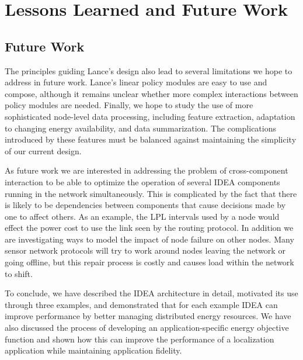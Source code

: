 \chapter{Lessons Learned and Future Work}
\label{chap-lessons}

\section{Future Work}


The principles guiding Lance's design also lead to several limitations we
hope to address in future work.  Lance's linear policy modules are easy to
use and compose, although it remains unclear whether more complex
interactions between policy modules are needed. Finally, we hope to study the
use of more sophisticated node-level data processing, including feature
extraction, adaptation to changing energy availability, and data
summarization.  The complications introduced by these features must be
balanced against maintaining the simplicity of our current design.


As future work we are interested in addressing the problem of cross-component
interaction to be able to optimize the operation of several IDEA components
running in the network simultaneously. This is complicated by the fact that
there is likely to be dependencies between components that cause decisions
made by one to affect others. As an example, the LPL intervals used by a node
would effect the power cost to use the link seen by the routing protocol.  In
addition we are investigating ways to model the impact of node failure on
other nodes. Many sensor network protocols will try to work around nodes
leaving the network or going offline, but this repair process is costly and
causes load within the network to shift.

To conclude, we have described the IDEA architecture in detail, motivated its
use through three examples, and demonstrated that for each example IDEA can
improve performance by better managing distributed energy resources. We have
also discussed the process of developing an application-specific energy
objective function and shown how this can improve the performance of a
localization application while maintaining application fidelity.
\vfill\eject
